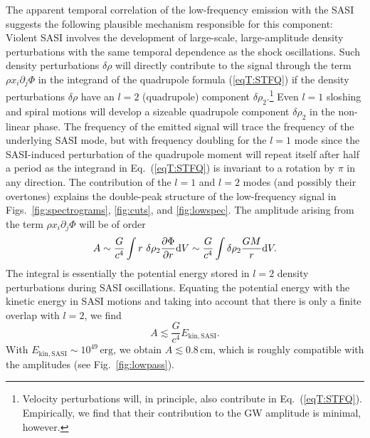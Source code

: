The apparent temporal correlation of the low-frequency emission
with the SASI suggests the following plausible mechanism responsible
for this component: Violent SASI involves the development
of large-scale, large-amplitude density perturbations with
the same temporal dependence as the shock oscillations. 
Such
density perturbations $\delta \rho$ will directly contribute
to the signal through the term
$\rho x_i \partial_j \Phi$ in the integrand
of the quadrupole formula (\ref{eqT:STFQ}) if the density
perturbations  $\delta \rho$ have an $l=2$ (quadrupole) component
$\delta \rho_2$.\footnote{Velocity
perturbations will, in principle, also contribute in Eq.~(\ref{eqT:STFQ}).
Empirically, we find that their contribution to the GW amplitude
is minimal, however.}
Even $l=1$ sloshing and spiral motions will develop
a sizeable quadrupole component $\delta \rho_2$ in the
non-linear phase. The frequency of the emitted signal will trace the frequency of the underlying
SASI mode, but with frequency doubling for the $l=1$ mode
since the SASI-induced perturbation of the quadrupole moment will repeat itself after half a period as
the integrand in Eq.~(\ref{eqT:STFQ}) is invariant
to a rotation by $\pi$ in any direction.
The contribution of the $l=1$ and $l=2$ modes
(and possibly their overtones) explains the double-peak
structure of the low-frequency signal in Figs.~\ref{fig:spectrograms},
\ref{fig:cuts}, and \ref{fig:lowspec}. The amplitude
arising from the term $\rho x_i \partial_j \Phi$ will be of order
\begin{equation}
A 
\sim 
 \frac{G}{c^4} \int r\ \delta {\rho_2} \frac{\partial \Phi}{\partial r} \mathrm{d} V
\sim
\frac{G}{c^4} \int \delta {\rho_2} \frac{G M}{r}  \mathrm{d} V.
\end{equation}
The integral is essentially the potential energy stored in
$l=2$ density perturbations during SASI oscillations. Equating the
potential energy
with the kinetic energy in SASI motions and taking into account that
there is only a finite overlap with $l=2$, we find
\begin{equation}
A 
\lesssim 
\frac{G}{c^4} E_\mathrm{kin,SASI}.
\end{equation}
With $E_\mathrm{kin,SASI} \sim 10^{49} \, \mathrm{erg}$, we
obtain $A \lesssim 0.8 \, \mathrm{cm}$, which is roughly compatible
with the amplitudes (see Fig.~\ref{fig:lowpass}).


